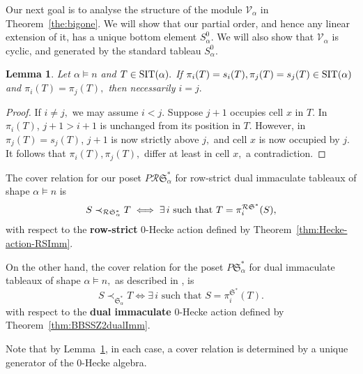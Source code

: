 \documentclass[12pt,letterpaper]{amsart}
\newtheorem{lemma}[theorem]{Lemma}
\theoremstyle{definition}
\newcommand{\poIcover}{\prec_{{\mathfrak{S}}^\ast _\alpha}}
\newcommand{\dI}{\mathfrak{S}^*}
\newcommand{\rdI}{\mathcal{R}\mathfrak{S}^*}
\begin{document}
Our next goal is to analyse the structure of the module $\mathcal{V}_\alpha$ in Theorem~\ref{the:bigone}. 
We will show that our partial order, and hence any linear extension of it, has a unique bottom element $S^0_\alpha$. We will also show that $\mathcal{V}_\alpha$  is cyclic, and generated by the 
standard tableau $S^0_\alpha$. 

\begin{lemma}\label{lem:uniqueness1} Let $\alpha\vDash n$ and $T\in \operatorname{SIT}(\alpha).$  If $\pi_i(T)=s_i(T), \pi_j(T)=s_j(T)\in \operatorname{SIT}(\alpha)$ and  $\pi_i(T)=\pi_j(T),$ then necessarily $i=j.$
\end{lemma}
\begin{proof} If $i\ne j,$ we may assume $i< j.$ Suppose $j+1$ occupies cell $x$ in $T.$ In $\pi_i(T)$,  $j+1>i+1$ is unchanged from its position in $T.$  However, in $\pi_j(T)=s_j(T)$, $j+1$ is now strictly above $j,$ and cell $x$ is now occupied by $j.$ It follows that $\pi_i(T),\pi_j(T),$ differ at least in cell $x,$ a contradiction.
\end{proof}

The cover relation for our poset $P\rdI_\alpha$ for row-strict dual immaculate tableaux of shape $\alpha\vDash n$  is 
\begin{equation}\label{eqn:rdIcover} 
S\poRIcover  T
\iff \exists\, i \text{ such that }  T=\pi_i^{\rdI}(S),
\end{equation}
 \noindent with respect to the  \textbf{row-strict} 0-Hecke action defined by Theorem~\ref{thm:Hecke-action-RSImm}.

On the other hand, the cover relation for the poset $P\dI_\alpha$ for dual immaculate tableaux of shape $\alpha\vDash n,$ as described in \cite{BBSSZ2015}, is
\begin{equation}\label{eqn:dIcover} 
S\poIcover  T
\iff \exists\, i \text{ such that }  S=\pi^{\dI}_i(T).
\end{equation}
\noindent with respect to the 
 \textbf{dual immaculate} 0-Hecke action defined  by Theorem~\ref{thm:BBSSZ2dualImm}.

Note that by Lemma~\ref{lem:uniqueness1}, in each case, a cover relation is determined by a unique generator of the 0-Hecke algebra.
\end{document}

